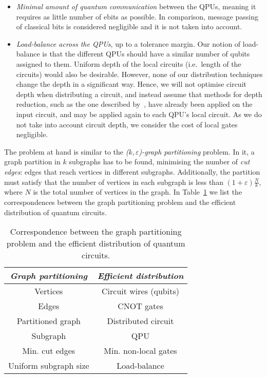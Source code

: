 \begin{itemize}
  \item \textit{Minimal amount of quantum communication} between the QPUs, meaning it requires as little number of ebits as possible. In comparison, message passing of classical bits is considered negligible and it is not taken into account.
  \item \textit{Load-balance across the QPUs}, up to a tolerance margin. Our notion of load-balance is that the different QPUs should have a similar number of qubits assigned to them. Uniform depth of the local circuits (i.e.\ length of the circuits) would also be desirable. However, none of our distribution techniques change the depth in a significant way. Hence, we will not optimise circuit depth when distributing a circuit, and instead assume that methods for depth reduction, such as the one described by~\citet{DepthReduction}, have already been applied on the input circuit, and may be applied again to each QPU's local circuit. As we do not take into account circuit depth, we consider the cost of local gates negligible.
\end{itemize}

The problem at hand is similar to the  \textit{(\(k,\varepsilon\))-graph partitioning} problem. In it, a graph partition in \(k\) subgraphs has to be found, minimising the number of \textit{cut edges}: edges that reach vertices in different subgraphs. Additionally, the partition must satisfy that the number of vertices in each subgraph is less than \((1 + \varepsilon)\frac{N}{k}\), where \(N\) is the total number of vertices in the graph. In Table~\ref{tab:matching} we list the correspondences between the graph partitioning problem and the efficient distribution of quantum circuits.

\begin{table}
\caption{Correspondence between the graph partitioning problem and the efficient distribution of quantum circuits.}
\label{tab:matching}
\centering
\begin{tabular}{|c|c|}
\hline
\textit{Graph partitioning} & \textit{Efficient distribution} \\
\hline
Vertices & Circuit wires (qubits) \\
Edges & CNOT gates \\
Partitioned graph & Distributed circuit \\
Subgraph & QPU \\
Min. cut edges & Min. non-local gates \\
Uniform subgraph size & Load-balance \\
\hline
\end{tabular}
\end{table}


